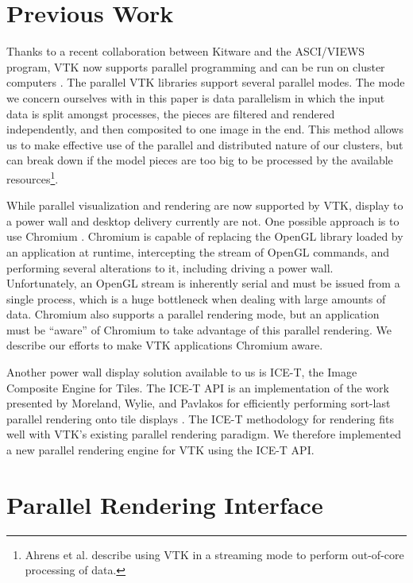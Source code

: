 \documentclass{acmsiggraph}
\begin{document}
  \section{Previous Work}
  \label{sec:previous_work}

  Thanks to a recent collaboration between Kitware and the ASCI/VIEWS
  program, VTK now supports parallel programming and can be run on cluster
  computers \cite{Ahrens00}.  The parallel VTK libraries support several
  parallel modes.  The mode we concern ourselves with in this paper is data
  parallelism in which the input data is split amongst processes, the
  pieces are filtered and rendered independently, and then composited to
  one image in the end.  This method allows us to make effective use of the
  parallel and distributed nature of our clusters, but can break down if
  the model pieces are too big to be processed by the available
  resources\footnote{Ahrens et al. \cite{Ahrens01} describe using VTK in a
  streaming mode to perform out-of-core processing of data.}.

  While parallel visualization and rendering are now supported by VTK,
  display to a power wall and desktop delivery currently are not.  One
  possible approach is to use Chromium \cite{Humphreys02}.  Chromium is
  capable of replacing the OpenGL library loaded by an application at
  runtime, intercepting the stream of OpenGL commands, and performing
  several alterations to it, including driving a power wall.
  Unfortunately, an OpenGL stream is inherently serial and must be issued
  from a single process, which is a huge bottleneck when dealing with large
  amounts of data.  Chromium also supports a parallel rendering mode, but
  an application must be ``aware'' of Chromium to take advantage of this
  parallel rendering.  We describe our efforts to make VTK applications
  Chromium aware.

  Another power wall display solution available to us is ICE-T, the Image
  Composite Engine for Tiles.  The ICE-T API is an implementation of the
  work presented by Moreland, Wylie, and Pavlakos for efficiently
  performing sort-last parallel rendering onto tile displays
  \cite{Moreland01}.  The ICE-T methodology for rendering fits well with
  VTK's existing parallel rendering paradigm.  We therefore implemented a
  new parallel rendering engine for VTK using the ICE-T API.


  \section{Parallel Rendering Interface}
  \label{sec:parallel_rendering_interface}
\end{document}
